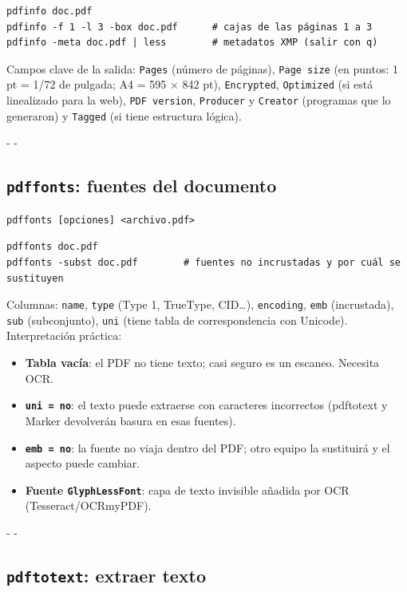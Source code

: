 \documentclass[11pt,a4paper]{article}
\makeatletter
\newcommand{\necesitaespacio}[1]{\par\penalty-100\begingroup
	\setlength{\dimen@}{#1}\dimen@ii\pagegoal\advance\dimen@ii-\pagetotal
	\ifdim\dimen@>\dimen@ii\ifdim\dimen@ii>\z@\vfil\fi\penalty-\@M\fi\endgroup}
\makeatother
\begin{document}
	\begin{lstlisting}
pdfinfo doc.pdf
pdfinfo -f 1 -l 3 -box doc.pdf      # cajas de las páginas 1 a 3
pdfinfo -meta doc.pdf | less        # metadatos XMP (salir con q)
\end{lstlisting}
	
	Campos clave de la salida: \texttt{Pages} (número de páginas), \texttt{Page size} (en puntos: 1 pt = 1/72 de pulgada; A4 = 595 × 842 pt), \texttt{Encrypted}, \texttt{Optimized} (si está linealizado para la web), \texttt{PDF version}, \texttt{Producer} y \texttt{Creator} (programas que lo generaron) y \texttt{Tagged} (si tiene estructura lógica).
	
	\necesitaespacio{8\baselineskip}
	\subsection{\texttt{pdffonts}: fuentes del documento}\label{sec:pdffonts}
	
	\begin{lstlisting}[style=sintaxis]
pdffonts [opciones] <archivo.pdf>
\end{lstlisting}
	
	\begin{lstlisting}
pdffonts doc.pdf
pdffonts -subst doc.pdf        # fuentes no incrustadas y por cuál se sustituyen
\end{lstlisting}
	
	Columnas: \texttt{name}, \texttt{type} (Type 1, TrueType, CID\ldots), \texttt{encoding}, \texttt{emb} (incrustada), \texttt{sub} (subconjunto), \texttt{uni} (tiene tabla de correspondencia con Unicode). Interpretación práctica:
	
	\begin{itemize}
		\item \textbf{Tabla vacía}: el PDF no tiene texto; casi seguro es un escaneo. Necesita OCR.
		\item \textbf{\texttt{uni = no}}: el texto puede extraerse con caracteres incorrectos (pdftotext y Marker devolverán basura en esas fuentes).
		\item \textbf{\texttt{emb = no}}: la fuente no viaja dentro del PDF; otro equipo la sustituirá y el aspecto puede cambiar.
		\item \textbf{Fuente \texttt{GlyphLessFont}}: capa de texto invisible añadida por OCR (Tesseract/OCRmyPDF).
	\end{itemize}
	
	\necesitaespacio{8\baselineskip}
	\subsection{\texttt{pdftotext}: extraer texto}\label{sec:pdftotext}
	
\end{document}
